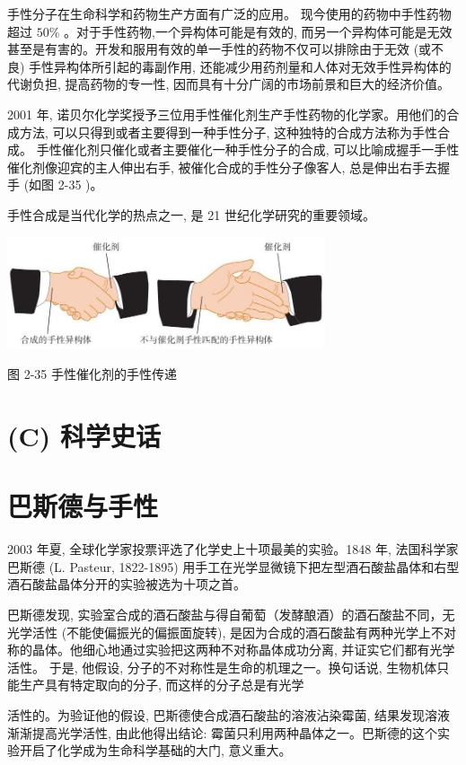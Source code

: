 \documentclass[10pt]{article}
\begin{document}
手性分子在生命科学和药物生产方面有广泛的应用。 现今使用的药物中手性药物超过 \({50}\%\) 。对于手性药物,一个异构体可能是有效的, 而另一个异构体可能是无效甚至是有害的。开发和服用有效的单一手性的药物不仅可以排除由于无效 (或不良) 手性异构体所引起的毒副作用, 还能减少用药剂量和人体对无效手性异构体的代谢负担, 提高药物的专一性, 因而具有十分广阔的市场前景和巨大的经济价值。

2001 年, 诺贝尔化学奖授予三位用手性催化剂生产手性药物的化学家。用他们的合成方法, 可以只得到或者主要得到一种手性分子, 这种独特的合成方法称为手性合成。 手性催化剂只催化或者主要催化一种手性分子的合成, 可以比喻成握手一手性催化剂像迎宾的主人伸出右手, 被催化合成的手性分子像客人, 总是伸出右手去握手 (如图 2-35 )。

手性合成是当代化学的热点之一, 是 21 世纪化学研究的重要领域。

\begin{center}
\includegraphics[max width=0.7\textwidth]{images/0190e026-5a11-7df7-bd27-54d09026ba7a_64_372882.jpg}
\end{center}

图 2-35 手性催化剂的手性传递

\section*{(C) 科学史话}

\section*{巴斯德与手性}

2003 年夏, 全球化学家投票评选了化学史上十项最美的实验。1848 年, 法国科学家巴斯德 (L. Pasteur, 1822-1895) 用手工在光学显微镜下把左型酒石酸盐晶体和右型酒石酸盐晶体分开的实验被选为十项之首。

巴斯德发现, 实验室合成的酒石酸盐与得自葡萄（发酵酿酒）的酒石酸盐不同，无光学活性 (不能使偏振光的偏振面旋转), 是因为合成的酒石酸盐有两种光学上不对称的晶体。他细心地通过实验把这两种不对称晶体成功分离, 并证实它们都有光学活性。 于是, 他假设, 分子的不对称性是生命的机理之一。换句话说, 生物机体只能生产具有特定取向的分子, 而这样的分子总是有光学

活性的。为验证他的假设, 巴斯德使合成酒石酸盐的溶液沾染霉菌, 结果发现溶液渐渐提高光学活性, 由此他得出结论: 霉菌只利用两种晶体之一。巴斯德的这个实验开启了化学成为生命科学基础的大门, 意义重大。
\end{document}
